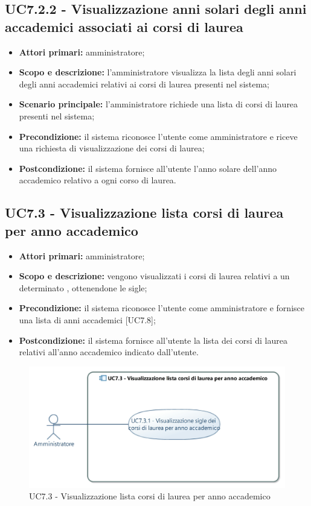 \documentclass[AnalisiDeiRequisiti.tex]{subfiles}
\begin{document}
\subsection{UC7.2.2 - Visualizzazione anni solari degli anni accademici associati ai corsi di laurea}
\begin{itemize}
	\item \textbf{Attori primari:} amministratore;
	\item \textbf{Scopo e descrizione:} l'amministratore visualizza la lista degli anni solari degli anni accademici relativi ai corsi di laurea presenti nel sistema;
	\item \textbf{Scenario principale:} l'amministratore richiede una lista di corsi di laurea presenti nel sistema;
	\item \textbf{Precondizione:} il sistema riconosce l'utente come amministratore e riceve una richiesta di visualizzazione dei corsi di laurea; 
	\item \textbf{Postcondizione:} il sistema fornisce all'utente l'anno solare dell'anno accademico relativo a ogni corso di laurea.
\end{itemize}
\subsection{UC7.3 - Visualizzazione lista corsi di laurea per anno accademico}
\begin{itemize}
	\item \textbf{Attori primari:} amministratore;
	\item \textbf{Scopo e descrizione:} vengono visualizzati i corsi di laurea relativi a un determinato , ottenendone le sigle;
	\item \textbf{Precondizione:} il sistema riconosce l'utente come amministratore e fornisce una lista di anni accademici [UC7.8];
	\item \textbf{Postcondizione:} il sistema fornisce all'utente la lista dei corsi di laurea relativi all'anno accademico indicato dall'utente.
\end{itemize}
\begin{figure}[H]
	\centering
	\includegraphics[width=0.7\linewidth]{UC7_3.jpg}
	\caption{UC7.3 - Visualizzazione lista corsi di laurea per anno accademico}
	\label{fig:UC7.3 - Visualizzazione lista corsi di laurea per anno accademico}
\end{figure}
\end{document}
